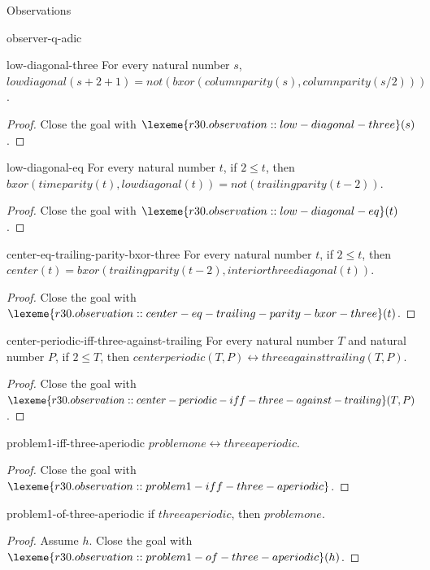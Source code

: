 \begin{lexlean}{Observations}
\begin{section}{observer-q-adic}
\begin{theorem}{low-diagonal-three}
For every natural number \(s\), \(lowdiagonal(s + 2 + 1) = not(bxor(columnparity(s), columnparity(s / 2)))\).
\begin{proof}
Close the goal with \(\lexeme{r30.observation::low-diagonal-three}(s)\).
\end{proof}
\end{theorem}

\begin{theorem}{low-diagonal-eq}
For every natural number \(t\), if \(2 ≤ t\), then \(bxor(timeparity(t), lowdiagonal(t)) = not(trailingparity(t - 2))\).
\begin{proof}
Close the goal with \(\lexeme{r30.observation::low-diagonal-eq}(t)\).
\end{proof}
\end{theorem}

\begin{theorem}{center-eq-trailing-parity-bxor-three}
For every natural number \(t\), if \(2 ≤ t\), then \(center(t) = bxor(trailingparity(t - 2), interiorthreediagonal(t))\).
\begin{proof}
Close the goal with \(\lexeme{r30.observation::center-eq-trailing-parity-bxor-three}(t)\).
\end{proof}
\end{theorem}

\begin{theorem}{center-periodic-iff-three-against-trailing}
For every natural number \(T\) and natural number \(P\), if \(2 ≤ T\), then \(centerperiodic(T, P) ↔ threeagainsttrailing(T, P)\).
\begin{proof}
Close the goal with \(\lexeme{r30.observation::center-periodic-iff-three-against-trailing}(T, P)\).
\end{proof}
\end{theorem}

\begin{theorem}{problem1-iff-three-aperiodic}
\(problemone ↔ threeaperiodic\).
\begin{proof}
Close the goal with \(\lexeme{r30.observation::problem1-iff-three-aperiodic}\).
\end{proof}
\end{theorem}

\begin{theorem}{problem1-of-three-aperiodic}
if \(threeaperiodic\), then \(problemone\).
\begin{proof}
Assume \(h\).
Close the goal with \(\lexeme{r30.observation::problem1-of-three-aperiodic}(h)\).
\end{proof}
\end{theorem}


\end{section}
\end{lexlean}
